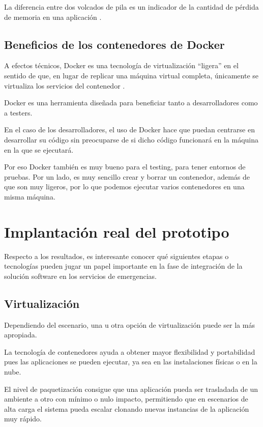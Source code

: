 La diferencia entre dos volcados de pila es un indicador de la cantidad de pérdida de memoria en una aplicación \cite{nodejs3}.

\subsection{Beneficios de los contenedores de Docker}

A efectos técnicos, Docker es una tecnología de virtualización “ligera” en el sentido de que, en lugar de replicar una máquina virtual completa, únicamente se virtualiza los servicios del contenedor \cite{docker3}.

Docker es una herramienta diseñada para beneficiar tanto a desarrolladores como a testers.

En el caso de los desarrolladores, el uso de Docker hace que puedan centrarse en desarrollar su código sin preocuparse de si dicho código funcionará en la máquina en la que se ejecutará.

Por eso Docker también es muy bueno para el testing, para tener entornos de pruebas. Por un lado, es muy sencillo crear y borrar un contenedor, además de que son muy ligeros, por lo que podemos ejecutar varios contenedores en una misma máquina.

\section{Implantación real del prototipo}

Respecto a los resultados, es interesante conocer qué siguientes etapas o tecnologías pueden jugar un papel importante en la fase de integración de la solución software en los servicios de emergencias.

\subsection{Virtualización}

Dependiendo del escenario, una u otra opción de virtualización puede ser la más apropiada.

La tecnología de contenedores ayuda a obtener mayor flexibilidad y portabilidad pues las aplicaciones se pueden ejecutar, ya sea en las instalaciones físicas o en la nube.

El nivel de paquetización consigue que una aplicación pueda ser trasladada de un ambiente a otro con mínimo o nulo impacto, permitiendo que en escenarios de alta carga el sistema pueda escalar clonando nuevas instancias de la aplicación muy rápido.

